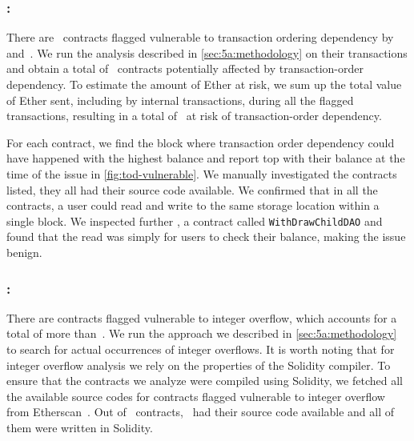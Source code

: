 



\subsubsection{\vto: \transactionorder}
There are~ contracts flagged vulnerable to transaction ordering dependency by~\cite{Luu2016a} and~\cite{DBLP:conf/ndss/KalraGDS18}. We run the analysis described in \autoref{sec:5a:methodology} on their  transactions and obtain a total of~ contracts potentially affected by transaction-order dependency. To estimate the amount of Ether at risk, we sum up the total value of Ether sent, including by internal transactions, during all the flagged transactions, resulting in a total of~ at risk of transaction-order dependency.

For each contract, we find the block where transaction order dependency could have happened with the highest balance and report top with their balance at the time of the issue in \autoref{fig:tod-vulnerable}. We manually investigated the contracts listed, they all had their source code available. We confirmed that in all the contracts, a user could read and write to the same storage location within a single block. We inspected further , a contract called \lstinline{WithDrawChildDAO} and found that the read was simply for users to check their balance, making the issue benign.

% 



\subsubsection{\vio: \integeroverflow}
\label{ssec:analysis-io}
There are  contracts flagged vulnerable to integer overflow, which accounts for a total of more than~. We run the approach we described in \autoref{sec:5a:methodology} to search for actual occurrences of integer overflows.
It is worth noting that for integer overflow analysis we rely on the properties of the Solidity compiler. To ensure that the contracts we analyze were compiled using Solidity, we fetched all the available source codes for contracts flagged vulnerable to integer overflow from Etherscan~\cite{etherscan}. Out of~ contracts,~ had their source code available and all of them were written in Solidity.

